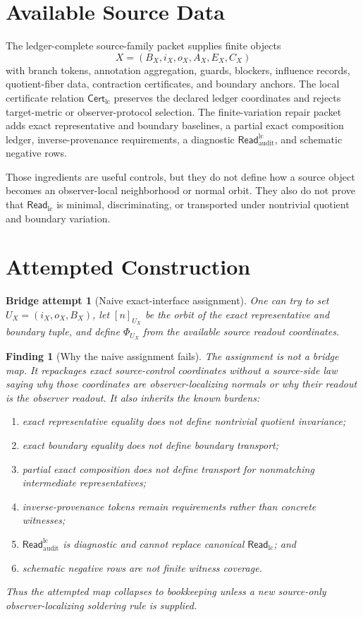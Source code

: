 \documentclass[11pt]{article}
\newcommand{\CertLC}{\mathsf{Cert}_{\mathrm{lc}}}
\newcommand{\ReadLC}{\mathsf{Read}_{\mathrm{lc}}}
\newcommand{\ReadAudit}{\mathsf{Read}_{\mathrm{audit}}^{\mathrm{lc}}}
\newtheorem{attempt}{Bridge attempt}
\newtheorem{finding}{Finding}
\begin{document}
\section{Available Source Data}

The ledger-complete source-family packet supplies finite objects
\[
    X=(B_X,i_X,o_X,A_X,E_X,C_X)
\]
with branch tokens, annotation aggregation, guards, blockers,
influence records, quotient-fiber data, contraction certificates, and
boundary anchors. The local certificate relation \(\CertLC\) preserves
the declared ledger coordinates and rejects target-metric or
observer-protocol selection. The finite-variation repair packet adds
exact representative and boundary baselines, a partial exact
composition ledger, inverse-provenance requirements, a diagnostic
\(\ReadAudit\), and schematic negative rows.

Those ingredients are useful controls, but they do not define how a
source object becomes an observer-local neighborhood or normal orbit.
They also do not prove that \(\ReadLC\) is minimal, discriminating, or
transported under nontrivial quotient and boundary variation.

\section{Attempted Construction}

\begin{attempt}[Naive exact-interface assignment]
One can try to set \(U_X=(i_X,o_X,B_X)\), let \([n]_{U_X}\) be the
orbit of the exact representative and boundary tuple, and define
\(\Phi_{U_X}\) from the available source readout coordinates.
\end{attempt}

\begin{finding}[Why the naive assignment fails]
The assignment is not a bridge map. It repackages exact source-control
coordinates without a source-side law saying why those coordinates are
observer-localizing normals or why their readout is the observer
readout. It also inherits the known burdens:
\begin{enumerate}
    \item exact representative equality does not define nontrivial
    quotient invariance;
    \item exact boundary equality does not define boundary transport;
    \item partial exact composition does not define transport for
    nonmatching intermediate representatives;
    \item inverse-provenance tokens remain requirements rather than
    concrete witnesses;
    \item \(\ReadAudit\) is diagnostic and cannot replace canonical
    \(\ReadLC\); and
    \item schematic negative rows are not finite witness coverage.
\end{enumerate}
Thus the attempted map collapses to bookkeeping unless a new
source-only observer-localizing soldering rule is supplied.
\end{finding}
\end{document}

